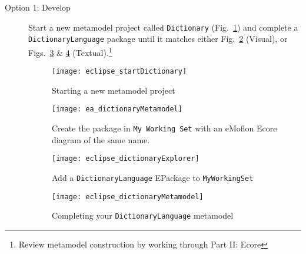 \begin{description}

\item[Option 1: Develop] Start a new metamodel project called \texttt{Dict\-ion\-ary} (Fig.~\ref{eclipse:startMetamodel}) and complete a
\texttt{DictionaryLanguage} package until it matches either Fig.~\ref{ea:dictLang} (Visual), or Figs.~\ref{eclipse:dictLang} \&
\ref{eclipse:dictLangMetamodel} (Textual).\footnote{Review metamodel construction by working through Part II: Ecore}

\begin{figure}[htbp]
\begin{center}
  \texttt{[image: eclipse\_startDictionary]}
  \caption{Starting a new metamodel project}
  \label{eclipse:startMetamodel}
\end{center}
\end{figure}

\newpage %

\vspace*{1cm}

\begin{figure}[htb]
\begin{center}
  \texttt{[image: ea\_dictionaryMetamodel]}
  \caption{Create the package in \texttt{My Working Set} with an eMoflon Ecore diagram of the same name.}
  \label{ea:dictLang}
\end{center}
\end{figure}

\vspace{2cm}

\begin{figure}[htb]
\begin{center}
  \texttt{[image: eclipse\_dictionaryExplorer]}
  \caption{Add a \texttt{DictionaryLanguage} EPackage to \texttt{MyWorkingSet}}
  \label{eclipse:dictLang}
\end{center}
\end{figure}

\newpage %

\vspace*{2cm}

\begin{figure}[h!]
\begin{center}
  \texttt{[image: eclipse\_dictionaryMetamodel]}
  \caption{Completing your \texttt{DictionaryLanguage} metamodel}
  \label{eclipse:dictLangMetamodel}
\end{center}
\end{figure}


\end{description}
